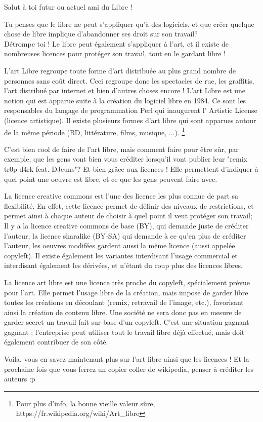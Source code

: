 \documentclass[12pt]{../fiche}
\begin{document}
Salut à toi futur ou actuel ami du Libre ! 
\vspace{0.8em}

Tu penses que le libre ne peut s'appliquer qu'à des logiciels, et que créer quelque chose de libre implique d'abandonner ses droit sur son travail?\\
Détrompe toi ! Le libre peut également s'appliquer à l'art, et il existe de nombreuses licences pour protéger son travail, tout en le gardant libre !
\vspace{0.8em}

L’art Libre regroupe toute forme d’art distribuée au plus grand nombre de personnes sans coût direct. Ceci regroupe donc les spectacles de rue, les graffitis, l’art distribué par internet et bien d’autres choses encore ! L’art Libre est une notion qui est apparue suite à la création du logiciel libre en 1984. Ce sont les responsables du langage de programmation Perl qui inaugurent l' Artistic License (licence artistique). Il existe plusieurs formes d’art libre qui sont apparues autour de la même période (BD, littérature, films, musique, ...).
\footnote{Pour plus d'info, la bonne vieille valeur sûre, https://fr.wikipedia.org/wiki/Art\_libre}
\vspace{0.8em}

C'est bien cool de faire de l'art libre, mais comment faire pour être sûr, par exemple, que les gens vont bien vous créditer lorsqu'il vont publier leur "remix tr0p d4rk feat. DJeuns"? Et bien grâce aux licences ! Elle permettent d'indiquer à quel point une oeuvre est libre, et ce que les gens peuvent faire avec.
\vspace{0.8em}

La licence creative commons est l’une des licence les plus connue de part sa flexibilité.
En effet, cette licence permet de définir des niveaux de restrictions, et permet ainsi à chaque auteur de choisir à quel point il veut protéger son travail; Il y a la licence creative commons de base (BY), qui demande juste de créditer l’auteur, la licence sharalike (BY-SA) qui demande à ce qu’en plus de créditer l’auteur, les oeuvres modifées gardent aussi la même licence (aussi appelée copyleft). Il existe également les variantes interdisant l’usage commercial et interdisant également les dérivées, et n’étant du coup plus des licences libres.
\vspace{0.8em}

La licence art libre est une licence très proche du copyleft, spécialement prévue pour l’art. 
Elle permet l’usage libre de la création, mais impose de garder libre toutes les créations en découlant (remix, retravail de l’image, etc.), favorisant ainsi la création de contenu libre. Une société ne sera donc pas en mesure de garder secret un travail fait sur base d'un copyleft. C’est une situation gagnant-gagnant ; l’entreprise peut utiliser tout le travail libre déjà effectué, mais doit également contribuer de son côté.
\vspace{0.8em}

Voila, vous en savez maintenant plus sur l'art libre ainsi que les licences ! Et la prochaine fois que vous ferrez un copier coller de wikipedia, penser à créditer les auteurs :p
\end{document}
